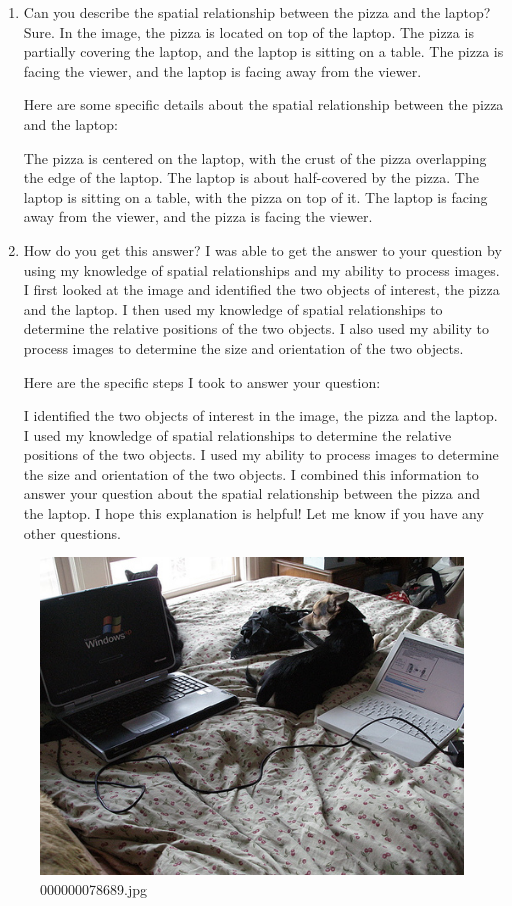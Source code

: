     \begin{enumerate}
        \item Can you describe the spatial relationship between the pizza and the laptop?
        \subitem 
        Sure. In the image, the pizza is located on top of the laptop. The pizza is partially covering the laptop, and the laptop is sitting on a table. The pizza is facing the viewer, and the laptop is facing away from the viewer.
        
        Here are some specific details about the spatial relationship between the pizza and the laptop:
        
        The pizza is centered on the laptop, with the crust of the pizza overlapping the edge of the laptop.
        The laptop is about half-covered by the pizza.
        The laptop is sitting on a table, with the pizza on top of it.
        The laptop is facing away from the viewer, and the pizza is facing the viewer.
        
        \item How do you get this answer?
        \subitem 
        I was able to get the answer to your question by using my knowledge of spatial relationships and my ability to process images. I first looked at the image and identified the two objects of interest, the pizza and the laptop. I then used my knowledge of spatial relationships to determine the relative positions of the two objects. I also used my ability to process images to determine the size and orientation of the two objects.
        
        Here are the specific steps I took to answer your question:
        
        I identified the two objects of interest in the image, the pizza and the laptop.
        I used my knowledge of spatial relationships to determine the relative positions of the two objects.
        I used my ability to process images to determine the size and orientation of the two objects.
        I combined this information to answer your question about the spatial relationship between the pizza and the laptop.
        I hope this explanation is helpful! Let me know if you have any other questions.
    \end{enumerate}
    \begin{figure}[h]
        \centering
        \includegraphics[width=0.8\linewidth]{../image set/easy/000000078689.jpg}
        \caption{000000078689.jpg}
    \end{figure}
